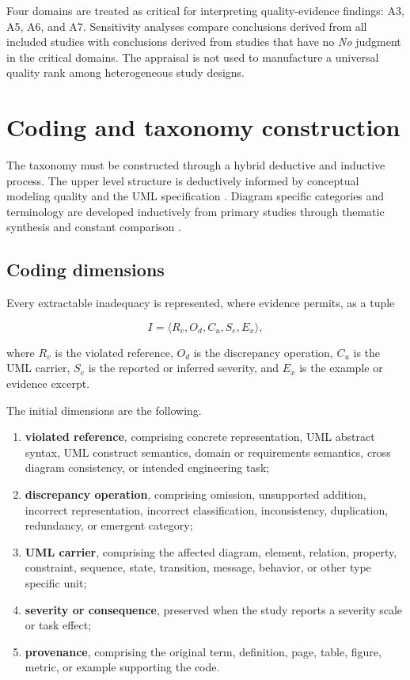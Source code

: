 Four domains are treated as critical for interpreting quality-evidence findings: A3, A5, A6, and A7. Sensitivity analyses compare conclusions derived from all included studies with conclusions derived from studies that have no \textit{No} judgment in the critical domains. The appraisal is not used to manufacture a universal quality rank among heterogeneous study designs.

\section{Coding and taxonomy construction}
\label{sec:protocol_coding}

The taxonomy must be constructed through a hybrid deductive and inductive process. The upper level structure is deductively informed by conceptual modeling quality and the UML specification \cite{Lindland1994Quality,Krogstie2006Process,OMG2017UML}. Diagram specific categories and terminology are developed inductively from primary studies through thematic synthesis and constant comparison \cite{Cruzes2011Thematic,Krippendorff2018Content}.

\subsection{Coding dimensions}

Every extractable inadequacy is represented, where evidence permits, as a tuple

\begin{equation}
I = \langle R_v, O_d, C_u, S_e, E_x \rangle,
\label{eq:protocol_inadequacy_tuple}
\end{equation}

where $R_v$ is the violated reference, $O_d$ is the discrepancy operation, $C_u$ is the UML carrier, $S_e$ is the reported or inferred severity, and $E_x$ is the example or evidence excerpt.

The initial dimensions are the following.

\begin{enumerate}[label=\roman*)]
    \item \textbf{violated reference}, comprising concrete representation, UML abstract syntax, UML construct semantics, domain or requirements semantics, cross diagram consistency, or intended engineering task;
    \item \textbf{discrepancy operation}, comprising omission, unsupported addition, incorrect representation, incorrect classification, inconsistency, duplication, redundancy, or emergent category;
    \item \textbf{UML carrier}, comprising the affected diagram, element, relation, property, constraint, sequence, state, transition, message, behavior, or other type specific unit;
    \item \textbf{severity or consequence}, preserved when the study reports a severity scale or task effect;
    \item \textbf{provenance}, comprising the original term, definition, page, table, figure, metric, or example supporting the code.
\end{enumerate}

